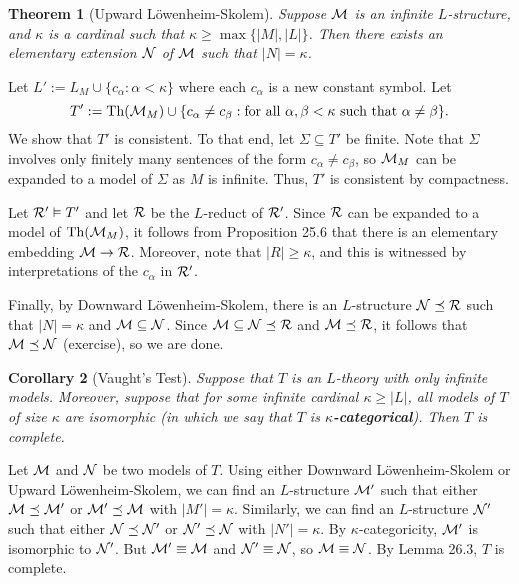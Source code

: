 \documentclass[10pt]{article}
\makeatletter
\DeclareMathOperator{\Th}{Th}
\theoremstyle{newstyle}
\newtheorem{thm}{Theorem}[section]
\newtheorem{cor}[thm]{Corollary}
\newenvironment{pf}[1][\proofname]{\par
  \pushQED{\qed}%
  \normalfont \topsep0\p@\relax
  \trivlist
  \item[\hskip\labelsep\scshape
  #1\@addpunct{.}]\ignorespaces
}{%
  \popQED\endtrivlist\@endpefalse
}
\makeatother
\begin{document}
\begin{thm}[Upward L\"owenheim-Skolem] 
Suppose ${\cal M}$ is an infinite $L$-structure, and $\kappa$ is a cardinal such that 
$\kappa \geq \max\{|M|, |L|\}$. Then there exists an elementary extension ${\cal N}$ of 
${\cal M}$ such that $|N| = \kappa$.
\end{thm}
\begin{pf}
Let $L' := L_M \cup \{c_\alpha : \alpha < \kappa\}$ where each $c_\alpha$ is a new constant symbol.
Let 
\[ T' := \Th({\cal M}_M) \cup \{c_\alpha \neq c_\beta : \text{for all } 
\alpha, \beta < \kappa \text{ such that }
\alpha \neq \beta\}. \]
We show that $T'$ is consistent. To that end, let $\Sigma \subseteq T'$ be finite. 
Note that $\Sigma$ involves only finitely many sentences of the form $c_\alpha \neq c_\beta$, 
so ${\cal M}_M$ can be expanded to a model of $\Sigma$ as $M$ is infinite. Thus, 
$T'$ is consistent by compactness. 

Let ${\cal R}' \vDash T'$ and let ${\cal R}$ be the $L$-reduct of ${\cal R}'$. 
Since ${\cal R}$ can be expanded to a model of $\Th({\cal M}_M)$, it follows from Proposition 
25.6 that there is an elementary embedding ${\cal M} \to {\cal R}$. Moreover, 
note that $|R| \geq \kappa$, and this is witnessed by interpretations of the 
$c_\alpha$ in ${\cal R}'$. 

Finally, by Downward L\"owenheim-Skolem, there is an $L$-structure ${\cal N} \preceq {\cal R}$ 
such that $|N| = \kappa$ and ${\cal M} \subseteq {\cal N}$. 
Since ${\cal M} \subseteq {\cal N} \preceq {\cal R}$ and ${\cal M} \preceq {\cal R}$, 
it follows that ${\cal M} \preceq {\cal N}$ (exercise), so we are done.
\end{pf}

\begin{cor}[Vaught's Test]
Suppose that $T$ is an $L$-theory with only infinite models. Moreover, suppose that 
for some infinite cardinal $\kappa \geq |L|$, all models of $T$ of size $\kappa$ are isomorphic 
(in which we say that $T$ is {\bf $\kappa$-categorical}). Then $T$ is complete.
\end{cor}
\begin{pf}
Let ${\cal M}$ and ${\cal N}$ be two models of $T$. Using either Downward L\"owenheim-Skolem 
or Upward L\"owenheim-Skolem, we can find an $L$-structure ${\cal M}'$ such that either 
${\cal M} \preceq {\cal M}'$ or ${\cal M}' \preceq {\cal M}$ with $|M'| = \kappa$. 
Similarly, we can find an $L$-structure ${\cal N}'$ such that either ${\cal N} \preceq {\cal N}'$ or
${\cal N}' \preceq {\cal N}$ with $|N'| = \kappa$. By $\kappa$-categoricity, ${\cal M}'$ 
is isomorphic to ${\cal N}'$. But ${\cal M}' \equiv {\cal M}$ and ${\cal N}' \equiv {\cal N}$, 
so ${\cal M} \equiv {\cal N}$. By Lemma 26.3, $T$ is complete.
\end{pf}
\end{document}
